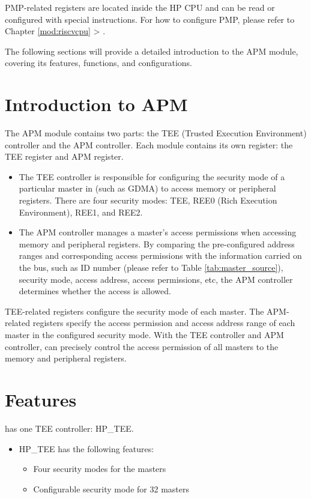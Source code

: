 \documentclass[main\_\_EN.tex]{subfiles}
\begin{document}
PMP-related registers are located inside the HP CPU and can be read or configured with special instructions. For how to configure PMP, please refer to Chapter \ref{mod:riscvcpu} \textit{} > \textit{}.

The following sections will provide a detailed introduction to the APM module, covering its features, functions, and configurations.

\section{Introduction to APM}

The APM module contains two parts: the TEE (Trusted Execution Environment) controller and the APM controller. Each module contains its own register: the TEE register and APM register.

\begin{itemize}
    \item The TEE controller is responsible for configuring the security mode of a particular master in \chipname{} (such as GDMA) to access memory or peripheral registers. There are four security modes: TEE, REE0 (Rich Execution Environment), REE1, and REE2.
    \item The APM controller manages a master's access permissions when accessing memory and peripheral registers. By comparing the pre-configured address ranges and corresponding access permissions with the information carried on the bus, such as ID number (please refer to Table \ref{tab:master_source}), security mode, access address, access permissions, etc, the APM controller determines whether the access is allowed.
\end{itemize}

TEE-related registers configure the security mode of each master. The APM-related registers specify the access permission and access address range of each master in the configured security mode. With the TEE controller and APM controller, \chipname{} can precisely control the access permission of all masters to the memory and peripheral registers.

\section{Features}\label{sec:permctrl-features}

\chipname{} has one TEE controller: HP\_TEE.

\begin{itemize}
    \item HP\_TEE has the following features:
        \begin{itemize}
        \item Four security modes for the masters
        \item Configurable security mode for 32 masters
        \end{itemize}

\end{itemize}
\end{document}
